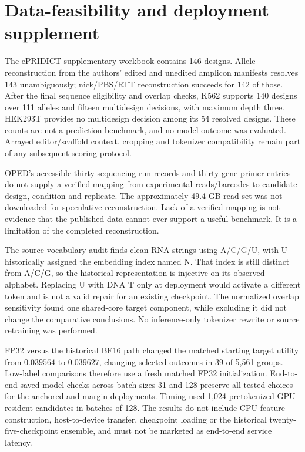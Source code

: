 \section{Data-feasibility and deployment supplement}
The ePRIDICT supplementary workbook contains 146 designs. Allele reconstruction from the authors' edited and unedited amplicon manifests resolves 143 unambiguously; nick/PBS/RTT reconstruction succeeds for 142 of those. After the final sequence eligibility and overlap checks, K562 supports 140 designs over 111 alleles and fifteen multidesign decisions, with maximum depth three. HEK293T provides no multidesign decision among its 54 resolved designs. These counts are not a prediction benchmark, and no model outcome was evaluated. Arrayed editor/scaffold context, cropping and tokenizer compatibility remain part of any subsequent scoring protocol.

OPED's accessible thirty sequencing-run records and thirty gene-primer entries do not supply a verified mapping from experimental reads/barcodes to candidate design, condition and replicate. The approximately 49.4 GB read set was not downloaded for speculative reconstruction. Lack of a verified mapping is not evidence that the published data cannot ever support a useful benchmark. It is a limitation of the completed reconstruction.

The source vocabulary audit finds clean RNA strings using A/C/G/U, with U historically assigned the embedding index named N. That index is still distinct from A/C/G, so the historical representation is injective on its observed alphabet. Replacing U with DNA T only at deployment would activate a different token and is not a valid repair for an existing checkpoint. The normalized overlap sensitivity found one shared-core target component, while excluding it did not change the comparative conclusions. No inference-only tokenizer rewrite or source retraining was performed.

FP32 versus the historical BF16 path changed the matched starting target utility from $0.039564$ to $0.039627$, changing selected outcomes in 39 of 5,561 groups. Low-label comparisons therefore use a fresh matched FP32 initialization. End-to-end saved-model checks across batch sizes 31 and 128 preserve all tested choices for the anchored and margin deployments. Timing used 1,024 pretokenized GPU-resident candidates in batches of 128. The results do not include CPU feature construction, host-to-device transfer, checkpoint loading or the historical twenty-five-checkpoint ensemble, and must not be marketed as end-to-end service latency.

